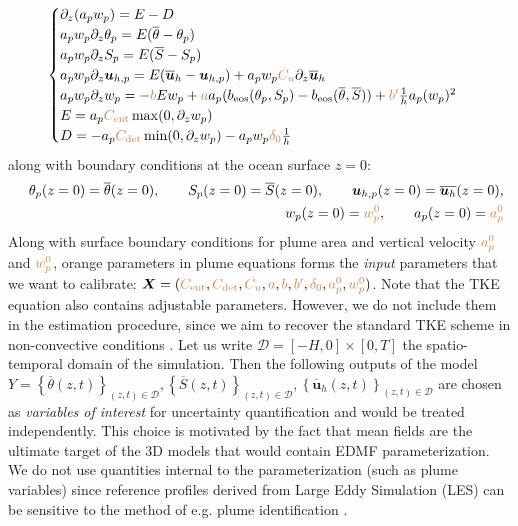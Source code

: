 \documentclass[draft]{agujournal2019}
\newcommand{\pbra}[1]{\ensuremath{\left\{#1\right\}}} %
\newcommand{\peru}[1]{\textcolor{peru}{{#1}}}
\begin{document}
\begin{eqnarray}\label{eq: plume model}
    \begin{cases}
        \partial_z (a_p w_p) = E-D
        \\
        a_p w_p \partial_z \theta_p = E (\overline{\theta} - \theta_p)
        \\
        a_p w_p \partial_z S_p = E (\overline{S} - S_p)   
        \\
        a_p w_p \partial_z \bm u_{h,p} = E (\overline{\bm u}_h - \bm u_{h,p}) + a_p w_p \peru{C_u} \partial_z   \overline{\bm u}_h 
        \\
        a_p w_p \partial_z w_p = - \peru{b} E w_p + \peru{a} a_p (b_{\rm{eos}}(\theta_p, S_p) - b_{\rm{eos}}(\overline{\theta},\overline{S}) ) +\peru{ b'} \frac{1}{h} a_p (w_p)^2 
        \\
        E = a_p \peru{C_{\rm ent}} \max (0,\partial_z w_p)
        \\
        D = -a_p \peru{C_{\rm det}} \min (0,\partial_z w_p) - a_p w_p \peru{\delta_0}\frac{1}{h}
    \end{cases}
\end{eqnarray}
%
along with boundary conditions at the ocean surface $z=0$:
%
\begin{eqnarray*}
    && \theta_p (z=0) = \overline{\theta}(z=0), \qquad S_p (z=0) = \overline{S}(z=0), \qquad \bm u_{h,p} (z=0) = \overline{\bm u_h}(z=0), 
    \\
    && w_p (z=0) = \peru{w_p^0}, \qquad a_p(z=0) = \peru{a_p^0}
\end{eqnarray*}
%
Along with surface boundary conditions for plume area and vertical velocity $\peru{a_p^0}$ and $\peru{w_p^0}$, orange parameters in plume equations  
 forms the \textit{input} parameters that we want to calibrate: $\bm X = (\peru{C_{\rm ent}}, \peru{C_{\rm det}}, \peru{C_u}, \peru{a}, \peru{b}, \peru{b'}, \peru{\delta_0}, \peru{a_p^0}, \peru{w_p^0})$. Note that the TKE equation also contains adjustable parameters. However, we do not include them in the estimation procedure, since we aim to recover the standard TKE scheme in non-convective conditions \cite<for an automatic calibration of an atmospheric TKE scheme, we refer to>{vignon_designing_2024}. Let us write $\mathcal{D}=[-H,0]\times[0,T]$ the spatio-temporal domain of the simulation. Then the following outputs of the model $Y =  \pbra{\overline{\theta}(z,t) }_{(z,t)\in \mathcal{D}}, \pbra{\overline{S}(z,t)}_{(z,t)\in \mathcal{D}} , \pbra{\overline{\bm u}_h(z,t)}_{(z,t)\in \mathcal{D}}$ are chosen as \textit{variables of interest} for uncertainty quantification and would be treated independently. This choice is motivated by the fact that mean fields are the ultimate target of the 3D models that would contain EDMF parameterization. We do not use quantities internal to the parameterization (such as plume variables) since reference profiles derived from Large Eddy Simulation (LES) can be sensitive to the method of e.g. plume identification \cite{couvreux_processbased_2021}.
\end{document}

